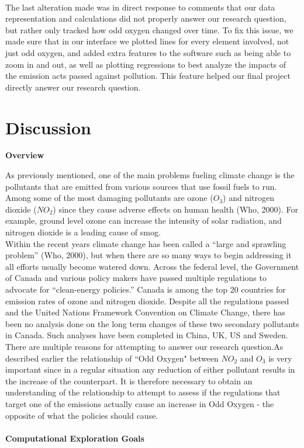 \documentclass[fontsize=11pt]{article}
\begin{document}
\\ The last alteration made was in direct response to comments that our data representation and calculations did not properly answer our research question, but rather only tracked how odd oxygen changed over time. To fix this issue, we made sure that in our interface we plotted lines for every element involved, not just odd oxygen, and added extra features to the software such as being able to zoom in and out, as well as plotting regressions to best analyze the impacts of the emission acts passed against pollution. This feature helped our final project directly answer our research question.


\section*{Discussion}

\textbf{Overview}

As previously mentioned, one of the main problems fueling climate change is the pollutants that are emitted from various sources that use fossil fuels to run. Among some of the most damaging pollutants are ozone ($O_3$) and nitrogen dioxide ($NO_2$) since they cause adverse effects on human health (Who, 2000). For example, ground level ozone can increase the intensity of solar radiation, and nitrogen dioxide is a leading cause of smog.\\

Within the recent years climate change has been called a “large and sprawling problem” (Who, 2000), but when there are so many ways to begin addressing it all efforts usually become watered down. Across the federal level, the Government of Canada and various policy makers have passed multiple regulations to advocate for “clean-energy policies.” Canada is among the top 20 countries for emission rates of ozone and nitrogen dioxide. Despite all the regulations passed and the United Nations Framework Convention on Climate Change, there has been no analysis done on the long term changes of these two secondary pollutants in Canada. Such analyses have been completed in China, UK, US and Sweden. There are multiple reasons for attempting to answer our research question.As described earlier the relationship of “Odd Oxygen" between $NO_2$ and $O_3$ is very important since in a regular situation any reduction of either pollutant results in the increase of the counterpart. It is therefore necessary to obtain an understanding of the relationship to attempt to assess if the regulations that target one of the emissions actually cause an increase in Odd Oxygen - the opposite of what the policies should cause.\\ \\ \textbf{Computational Exploration Goals}
\end{document}
